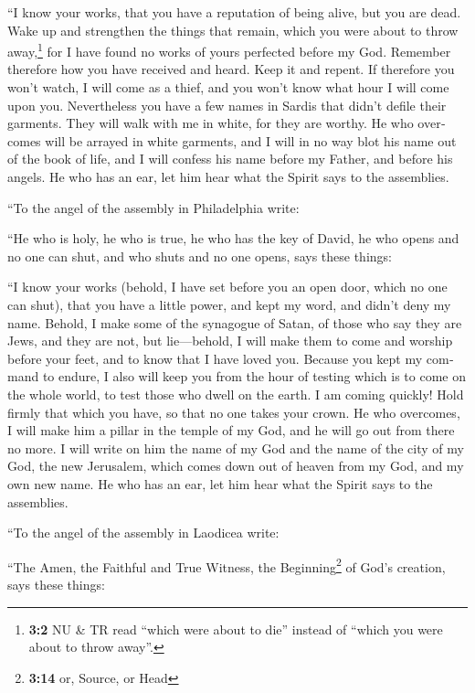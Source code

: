 \begin{paracol}{2}
\begin{otherlanguage}{english}
``I know your works, that you have a reputation of being alive, but you
are dead.  Wake up and strengthen the things that remain,
which you were about to throw away,\footnote{\textbf{3:2} NU \& TR read
  ``which were about to die'' instead of ``which you were about to throw
  away''.} for I have found no works of yours perfected before my God.
 Remember therefore how you have received and heard. Keep
it and repent. If therefore you won't watch, I will come as a thief, and
you won't know what hour I will come upon you. 
Nevertheless you have a few names in Sardis that didn't defile their
garments. They will walk with me in white, for they are worthy.
 He who overcomes will be arrayed in white garments, and I
will in no way blot his name out of the book of life, and I will confess
his name before my Father, and before his angels.  He who
has an ear, let him hear what the Spirit says to the assemblies.

 ``To the angel of the assembly in Philadelphia write:

``He who is holy, he who is true, he who has the key of David, he who
opens and no one can shut, and who shuts and no one opens, says these
things:

 ``I know your works (behold, I have set before you an
open door, which no one can shut), that you have a little power, and
kept my word, and didn't deny my name.  Behold, I make
some of the synagogue of Satan, of those who say they are Jews, and they
are not, but lie---behold, I will make them to come and worship before
your feet, and to know that I have loved you.  Because
you kept my command to endure, I also will keep you from the hour of
testing which is to come on the whole world, to test those who dwell on
the earth.  I am coming quickly! Hold firmly that which
you have, so that no one takes your crown.  He who
overcomes, I will make him a pillar in the temple of my God, and he will
go out from there no more. I will write on him the name of my God and
the name of the city of my God, the new Jerusalem, which comes down out
of heaven from my God, and my own new name.  He who has
an ear, let him hear what the Spirit says to the assemblies.

 ``To the angel of the assembly in Laodicea write:

``The Amen, the Faithful and True Witness, the Beginning\footnote{\textbf{3:14}
  or, Source, or Head} of God's creation, says these things:


\end{otherlanguage}
\end{paracol}
